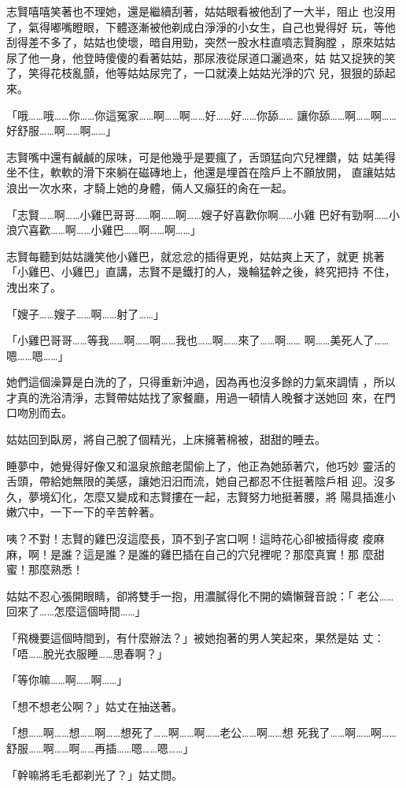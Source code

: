 志賢嘻嘻笑著也不理她，還是繼續刮著，姑姑眼看被他刮了一大半，阻止
也沒用了，氣得嘟嘴瞪眼，下體逐漸被他剃成白淨淨的小女生，自己也覺得好
玩，等他刮得差不多了，姑姑也使壞，暗自用勁，突然一股水柱直噴志賢胸膛
，原來姑姑尿了他一身，他登時傻傻的看著姑姑，那尿液從尿道口灑過來，姑
姑又捉狹的笑了，笑得花枝亂顫，他等姑姑尿完了，一口就湊上姑姑光淨的穴
兒，狠狠的舔起來。

「哦……哦……你……你這冤家……啊……啊……好……好……你舔……
讓你舔……啊……啊……好舒服……啊……啊……」

志賢嘴中還有鹹鹹的尿味，可是他幾乎是要瘋了，舌頭猛向穴兒裡鑽，姑
姑美得坐不住，軟軟的滑下來躺在磁磚地上，他還是埋首在陰戶上不願放開，
直讓姑姑浪出一次水來，才騎上她的身體，倆人又癲狂的肏在一起。

「志賢……啊……小雞巴哥哥……啊……啊……嫂子好喜歡你啊……小雞
巴好有勁啊……小浪穴喜歡……啊……小雞巴……啊……啊……」

志賢每聽到姑姑譏笑他小雞巴，就忿忿的插得更兇，姑姑爽上天了，就更
挑著「小雞巴、小雞巴」直講，志賢不是鐵打的人，幾輪猛幹之後，終究把持
不住，洩出來了。

「嫂子……嫂子……啊……射了……」

「小雞巴哥哥……等我……啊……啊……我也……啊……來了……啊……
啊……美死人了……嗯……嗯……」

她們這個澡算是白洗的了，只得重新沖過，因為再也沒多餘的力氣來調情
，所以才真的洗浴清淨，志賢帶姑姑找了家餐廳，用過一頓情人晚餐才送她回
來，在門口吻別而去。

姑姑回到臥房，將自己脫了個精光，上床擁著棉被，甜甜的睡去。

睡夢中，她覺得好像又和溫泉旅館老闆偷上了，他正為她舔著穴，他巧妙
靈活的舌頭，帶給她無限的美感，讓她汨汨而流，她自己都忍不住挺著陰戶相
迎。沒多久，夢境幻化，怎麼又變成和志賢摟在一起，志賢努力地挺著腰，將
陽具插進小嫩穴中，一下一下的辛苦幹著。

咦？不對！志賢的雞巴沒這麼長，頂不到子宮口啊！這時花心卻被插得痠
痠麻麻，啊！是誰？這是誰？是誰的雞巴插在自己的穴兒裡呢？那麼真實！那
麼甜蜜！那麼熟悉！

姑姑不忍心張開眼睛，卻將雙手一抱，用濃膩得化不開的嬌懶聲音說：「
老公……回來了……怎麼這個時間……」

「飛機要這個時間到，有什麼辦法？」被她抱著的男人笑起來，果然是姑
丈：「唔……脫光衣服睡……思春啊？」

「等你嘛……啊……啊……」

「想不想老公啊？」姑丈在抽送著。

「想……啊……想……啊……想死了……啊……啊……老公……啊……想
死我了……啊……啊……舒服……啊……啊……再插……嗯……嗯……」

「幹嘛將毛毛都剃光了？」姑丈問。

